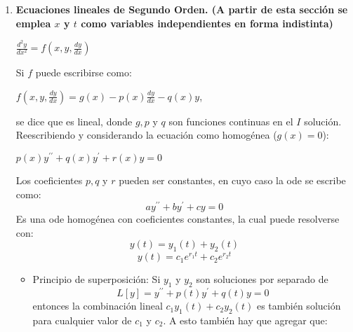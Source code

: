 \documentclass[twoside, twocolumn, 10pt]{article}
\begin{document}
{\begin{small}
\begin{enumerate}
\item \textbf{Ecuaciones lineales de Segundo Orden. (A partir de esta sección se emplea $x$ y $t$ como variables independientes en forma indistinta)} 
    \begin{center}
    $\frac{d^{2}y}{dx^{2}}=f(x,y,\frac{dy}{dx})$\\ 
    \end{center}

    Si $f$ puede escribirse como:

    \begin{center}
    $f(x,y,\frac{dy}{dx})=g(x)-p(x)\frac{dy}{dx}-q(x)y$, 
    \end{center}
    se dice que es lineal, donde
    $g,p$ y $q$ son funciones continuas en el $I$ solución.
    Reescribiendo y considerando la ecuación como homogénea ($g(x)=0$): 
    \begin{center}
    $p(x)y^{\prime\prime} + q(x)y^{\prime} + r(x)y = 0$
    \end{center}
    Los coeficientes $p,q$ y $r$ pueden ser constantes, en cuyo caso la ode se escribe como:
    \begin{equation} \label{coef-ctes}
     ay^{\prime\prime} + by^{\prime} + cy =0
    \end{equation}
Es una ode homogénea con coeficientes constantes, la cual puede resolverse con:
\begin{equation}
 y(t)=y_{1}(t) + y_{2}(t) 
\end{equation}
\begin{equation}
 y(t) = c_{1} e^{r_{1}t} + c_{2}e^{r_{2}t}
\end{equation}

\begin{itemize}
    \item Principio de superposición:
        Si $y_{1}$ y $y_{2}$ son soluciones por separado de 
        \begin{equation}
        L[y]=y^{\prime\prime} + p(t)y^{\prime} + q(t)y=0
        \end{equation}
        entonces la combinación lineal $c_{1}y_{1}(t)+c_{2}y_{2}(t)$ es también
        solución para cualquier valor de $c_{1}$ y $c_{2}$. A esto también hay que agregar que:
        

\end{itemize}
\end{enumerate}
\end{small}}
\end{document}
